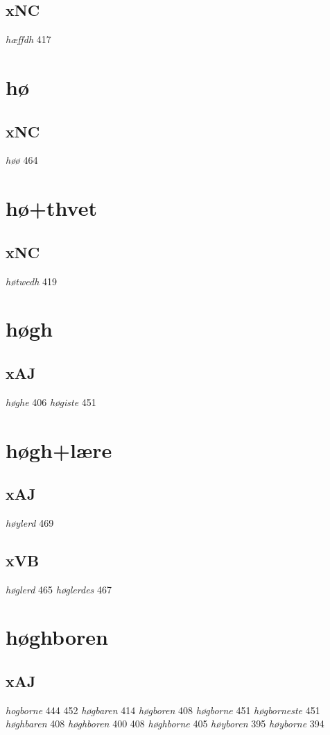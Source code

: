 \documentclass[a4paper,twocolumn]{article}
\begin{document}
\subsection{xNC}
\label{sec:org306d0ff}
\emph{hæffdh} 417 
\section{hø}
\label{sec:orgffb89eb}
\subsection{xNC}
\label{sec:org9e235a8}
\emph{høø} 464 
\section{hø+thvet}
\label{sec:orgb0848e7}
\subsection{xNC}
\label{sec:org7c4dbed}
\emph{høtwedh} 419 
\section{høgh}
\label{sec:orgd5d6e2e}
\subsection{xAJ}
\label{sec:orgc48b9c6}
\emph{høghe} 406 \emph{høgiste} 451 
\section{høgh+lære}
\label{sec:org4677586}
\subsection{xAJ}
\label{sec:org0fdc781}
\emph{høylerd} 469 
\subsection{xVB}
\label{sec:orgae202aa}
\emph{høglerd} 465 \emph{høglerdes} 467 
\section{høghboren}
\label{sec:org2fb312e}
\subsection{xAJ}
\label{sec:org8774206}
\emph{hogborne} 444 452 \emph{høgbaren} 414 \emph{høgboren} 408 \emph{høgborne} 451 \emph{høgborneste} 451 \emph{høghbaren} 408 \emph{høghboren} 400 408 \emph{høghborne} 405 \emph{høyboren} 395 \emph{høyborne} 394 
\end{document}
